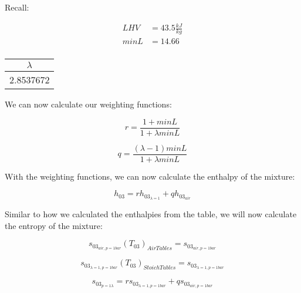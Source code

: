 \documentclass[titlepage]{article}
\begin{document}
    Recall:

    \begin{equation}
        \begin{aligned}
            \text{$LHV$} &=  43.5 \frac{kJ}{kg} \\
            \text{$minL$} &=  14.66 \\
        \end{aligned}
    \end{equation}

    \begin{center}
        \begin{tabular}{|c|}
            \hline
            $\lambda$ \\
            \hline
            2.8537672 \\
            \hline
        \end{tabular}
    \end{center}

    We can now calculate our weighting functions:

    \begin{equation}
        r = \frac{1 + minL}{1 + \lambda minL}
    \end{equation}

    \begin{equation}
        q = \frac{(\lambda -1)minL}{1+\lambda minL}
    \end{equation}

    With the weighting functions, we can now calculate the enthalpy of the mixture:

    \begin{equation}
        h_{03} = r h_{03_{\lambda=1}} + q h_{03_{air}}
    \end{equation}

    Similar to how we calculated the enthalpies from the table, we will now calculate the entropy of the mixture:

    \begin{equation}
        s_{03_{air, p= 1 bar}}(T_{03})_{Air Tables} = s_{03_{air, p=1 bar}}
    \end{equation} 

    \begin{equation}
        s_{03_{\lambda=1, p= 1 bar}}(T_{03})_{Stoich  Tables} = s_{03_{\lambda=1, p = 1 bar}}
    \end{equation}

    \begin{equation}
        s_{03_{p=1 \lambda}} = r s_{03_{\lambda=1, p=1 bar}} + q s_{03_{air, p=1 bar}}
    \end{equation}
\end{document}
